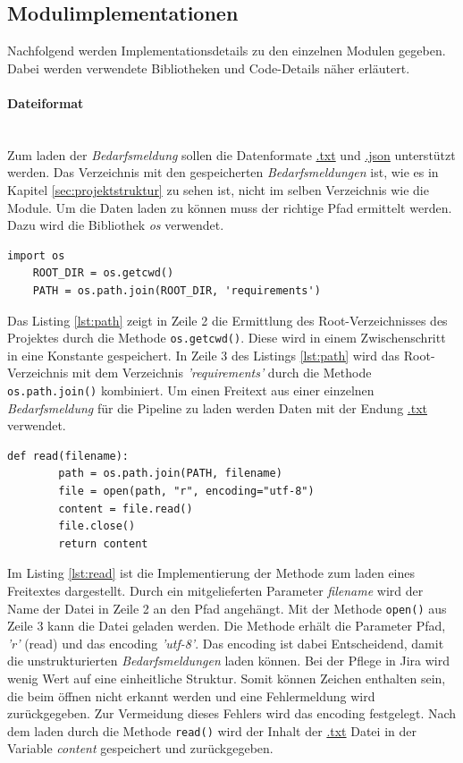 \subsection{Modulimplementationen}
Nachfolgend werden Implementationsdetails zu den einzelnen Modulen gegeben. Dabei werden verwendete Bibliotheken und Code-Details näher erläutert.
\paragraph{Dateiformat}\mbox{}\\
Zum laden der \emph{Bedarfsmeldung} sollen die Datenformate \url{.txt} und \url{.json} unterstützt werden. Das Verzeichnis mit den gespeicherten \emph{Bedarfsmeldungen} ist, wie es in Kapitel \ref{sec:projektstruktur} zu sehen ist, nicht im selben Verzeichnis wie die Module. Um die Daten laden zu können muss der richtige Pfad ermittelt werden. Dazu wird die Bibliothek \emph{os} verwendet.
\begin{lstlisting}[caption={Teilimplementation des Moduls \emph{readRequirements.py}}, label=lst:path]
	import os
	ROOT_DIR = os.getcwd()
	PATH = os.path.join(ROOT_DIR, 'requirements') 
\end{lstlisting}
Das Listing \ref{lst:path} zeigt in Zeile 2 die Ermittlung des Root-Verzeichnisses des Projektes durch die Methode \lstinline{os.getcwd()}.
Diese wird in einem Zwischenschritt in eine Konstante gespeichert. In Zeile 3 des Listings \ref{lst:path} wird das Root-Verzeichnis mit dem Verzeichnis \emph{'requirements'} durch die Methode \lstinline{os.path.join()} kombiniert.
Um einen Freitext aus einer einzelnen \emph{Bedarfsmeldung} für die Pipeline zu laden werden Daten mit der Endung \url{.txt} verwendet.
\begin{lstlisting}[caption={Implementation der Methode read() des Moduls \emph{readRequirements.py}}, label=lst:read]
	def read(filename):
		path = os.path.join(PATH, filename)
		file = open(path, "r", encoding="utf-8")
		content = file.read()
		file.close()
		return content
\end{lstlisting}
Im Listing \ref{lst:read} ist die Implementierung der Methode zum laden eines Freitextes dargestellt. Durch ein mitgelieferten Parameter \emph{filename} wird der Name der Datei in Zeile 2 an den Pfad angehängt. Mit der Methode \lstinline{open()}
aus Zeile 3 kann die Datei geladen werden. Die Methode erhält die Parameter Pfad, \emph{'r'} (read) und das encoding \emph{'utf-8'}. Das encoding ist dabei Entscheidend, damit die unstrukturierten \emph{Bedarfsmeldungen} laden können. Bei der Pflege in Jira wird wenig Wert auf eine einheitliche Struktur. Somit können Zeichen enthalten sein, die beim öffnen nicht erkannt werden und eine Fehlermeldung wird zurückgegeben. Zur Vermeidung dieses Fehlers wird das encoding festgelegt. Nach dem laden durch die Methode \lstinline{read()} wird der Inhalt der \url{.txt} Datei in der Variable \emph{content} gespeichert und zurückgegeben.
